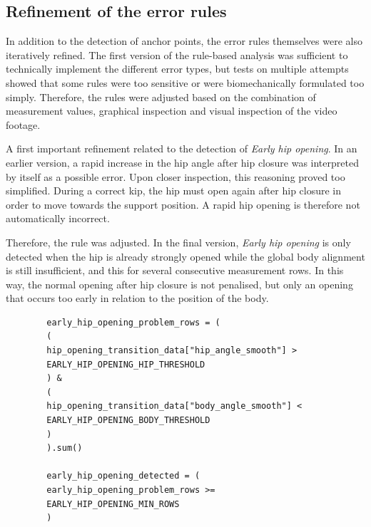 \subsection{Refinement of the error rules}

In addition to the detection of anchor points, the error rules themselves were also iteratively refined. The first version of the rule-based analysis was sufficient to technically implement the different error types, but tests on multiple attempts showed that some rules were too sensitive or were biomechanically formulated too simply. Therefore, the rules were adjusted based on the combination of measurement values, graphical inspection and visual inspection of the video footage.

A first important refinement related to the detection of \textit{Early hip opening}. In an earlier version, a rapid increase in the hip angle after hip closure was interpreted by itself as a possible error. Upon closer inspection, this reasoning proved too simplified. During a correct kip, the hip must open again after hip closure in order to move towards the support position. A rapid hip opening is therefore not automatically incorrect.

Therefore, the rule was adjusted. In the final version, \textit{Early hip opening} is only detected when the hip is already strongly opened while the global body alignment is still insufficient, and this for several consecutive measurement rows. In this way, the normal opening after hip closure is not penalised, but only an opening that occurs too early in relation to the position of the body.

\begin{listing}[H]
    \begin{verbatim}
        early_hip_opening_problem_rows = (
        (
        hip_opening_transition_data["hip_angle_smooth"] >
        EARLY_HIP_OPENING_HIP_THRESHOLD
        ) &
        (
        hip_opening_transition_data["body_angle_smooth"] <
        EARLY_HIP_OPENING_BODY_THRESHOLD
        )
        ).sum()
        
        early_hip_opening_detected = (
        early_hip_opening_problem_rows >=
        EARLY_HIP_OPENING_MIN_ROWS
        )
    \end{verbatim}
    \caption{Refined detection rule for early hip opening from \href{https://github.com/Tristanvanspeybroeck/bachelorproef-Methodologie-25-26-Van-Speybroeck-Tristan/blob/main/Methodologie/pose_project/src/analyze_kip_execution.py}{\texttt{analyze\_kip\_execution.py}}}
    \label{lst:early_hip_opening_rule}
\end{listing}

